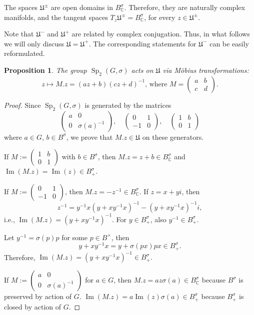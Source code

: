\documentclass[a4paper,oneside,11pt]{amsart}
\DeclareMathOperator{\Sp}{Sp}
\DeclareMathOperator{\Imm}{Im}
\newcommand{\CC}{\mathbb C}
\theoremstyle{plain}
\newtheorem{prop}[teo]{Proposition}
\theoremstyle{definition}
\theoremstyle{remark}
\begin{document}
The spaces $\mathfrak U^\pm$ are open domains in $B_\CC^{\sigma}$. Therefore, they are naturally complex manifolds, and the tangent spaces $T_z\mathfrak U^\pm= B_\CC^{\sigma}$, for every $z\in \mathfrak U^\pm$.

Note that $\mathfrak U^-$ and $\mathfrak U^+$ are related by complex conjugation. Thus, in what follows we will only discuss $\mathfrak U=\mathfrak U^+$. The corresponding statements for $\mathfrak U^-$ can be easily reformulated.

\begin{prop}
The group $\Sp_2(G,\sigma)$ acts on $\mathfrak U$ via M\"obius transformations:
$$z\mapsto M.z=(az+b)(cz+d)^{-1}\text{, where } M=\begin{pmatrix}a & b \\ c & d \end{pmatrix}.$$
\end{prop}

\begin{proof}
Since $\Sp_2(G,\sigma)$ is generated by the matrices
$$\begin{pmatrix}
    a & 0 \\
    0 & \sigma(a)^{-1}
    \end{pmatrix},\quad
\begin{pmatrix}
    0 & 1 \\
    -1 & 0
    \end{pmatrix},\quad
\begin{pmatrix}
    1 & b \\
    0 & 1
    \end{pmatrix}$$
where $a\in G$, $b\in B^{\sigma}$, we prove that $M.z\in \mathfrak U$ on these generators.

If $M:=\begin{pmatrix}
    1 & b \\
    0 & 1
    \end{pmatrix}$ with $b\in B^{\sigma}$, then $M.z=z+b\in B^{\sigma}_\CC$ and $\Imm(M.z)=\Imm(z)\in B^{\sigma}_+$.

If $M:=\begin{pmatrix}
    0 & 1 \\
    -1 & 0
    \end{pmatrix}$,
then $M.z=-z^{-1}\in B^{\sigma}_\CC$. If $z=x+yi$, then $$z^{-1}=y^{-1}x(y+xy^{-1}x)^{-1}-(y+xy^{-1}x)^{-1}i,$$
i.e., $\Imm(M.z)=(y+xy^{-1}x)^{-1}$. For $y\in B^{\sigma}_+$, also $y^{-1}\in B^{\sigma}_+$.

Let $y^{-1}=\sigma(p)p$ for some $p\in B^\times$, then
$$y+xy^{-1}x=y+\sigma(px)px\in B^{\sigma}_+.$$
Therefore, $\Imm(M.z)=(y+xy^{-1}x)^{-1}\in B^{\sigma}_+.$

If $M:=\begin{pmatrix}
    a & 0 \\
    0 & \sigma(a)^{-1}
    \end{pmatrix}$
for $a\in G$, then $M.z=az\sigma(a)\in B^{\sigma}_\CC$ because $B^{\sigma}$ is preserved by action of $G$. $\Imm(M.z)=a\Imm(z)\sigma(a)\in B^{\sigma}_+$ because $B^{\sigma}_+$ is closed by action of $G$.
\end{proof}
\end{document}
